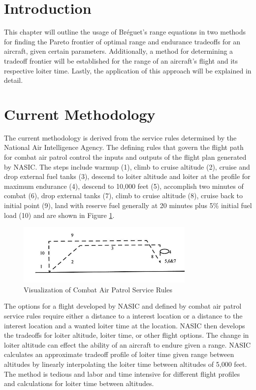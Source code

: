 \section{Introduction}
This chapter will outline the usage of Br\'eguet's range equations in two methods for finding the Pareto frontier of optimal range and endurance tradeoffs for an aircraft, given certain parameters. Additionally, a method for determining a tradeoff frontier will be established for the range of an aircraft's flight and its respective loiter time. Lastly, the application of this approach will be explained in detail.\par
\section{Current Methodology}
The current methodology is derived from the service rules determined by the National Air Intelligence Agency. The defining rules that govern the flight path for combat air patrol control the inputs and outputs of the flight plan generated by NASIC. The steps include warmup (1), climb to cruise altitude (2), cruise and drop external fuel tanks (3), descend to loiter altitude and loiter at the profile for maximum endurance (4), descend to 10,000 feet (5), accomplish two minutes of combat (6), drop external tanks (7), climb to cruise altitude (8), cruise back to initial point (9), land with reserve fuel generally at 20 minutes plus 5\% initial fuel load (10) and are shown in Figure \ref{fig: serviceRules}.\par
\begin{figure}[H]
    \centering
    \includegraphics{Thesis/Method/CombatServiceRules.PNG}
    \caption{Visualization of Combat Air Patrol Service Rules}
    \label{fig: serviceRules}
\end{figure}
The options for a flight developed by NASIC and defined by combat air patrol service rules require either a distance to a interest location or a distance to the interest location and a wanted loiter time at the location. NASIC then develops the tradeoffs for loiter altitude, loiter time, or other flight options. The change in loiter altitude can effect the ability of an aircraft to endure given a range. NASIC calculates an approximate tradeoff profile of loiter time given range between altitudes by linearly interpolating the loiter time between altitudes of 5,000 feet. The method is tedious and labor and time intensive for different flight profiles and calculations for loiter time between altitudes.

